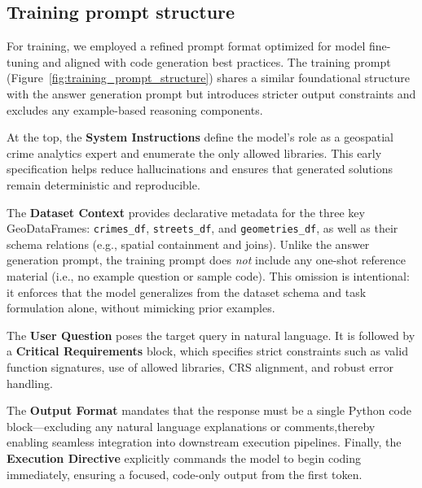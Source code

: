 \subsection{Training prompt structure}

For training, we employed a refined prompt format optimized for model fine-tuning and aligned with code generation best practices. The training prompt (Figure~\ref{fig:training_prompt_structure}) shares a similar foundational structure with the answer generation prompt but introduces stricter output constraints and excludes any example-based reasoning components.

At the top, the \textbf{System Instructions} define the model’s role as a geospatial crime analytics expert and enumerate the only allowed libraries. This early specification helps reduce hallucinations and ensures that generated solutions remain deterministic and reproducible.

The \textbf{Dataset Context} provides declarative metadata for the three key GeoDataFrames: \texttt{crimes\_df}, \texttt{streets\_df}, and \texttt{geometries\_df}, as well as their schema relations (e.g., spatial containment and joins). Unlike the answer generation prompt, the training prompt does \emph{not} include any one-shot reference material (i.e., no example question or sample code). This omission is intentional: it enforces that the model generalizes from the dataset schema and task formulation alone, without mimicking prior examples.

The \textbf{User Question} poses the target query in natural language. It is followed by a \textbf{Critical Requirements} block, which specifies strict constraints such as valid function signatures, use of allowed libraries, CRS alignment, and robust error handling.

The \textbf{Output Format} mandates that the response must be a single Python code block—excluding any natural language explanations or comments,thereby enabling seamless integration into downstream execution pipelines. Finally, the \textbf{Execution Directive} explicitly commands the model to begin coding immediately, ensuring a focused, code-only output from the first token.

